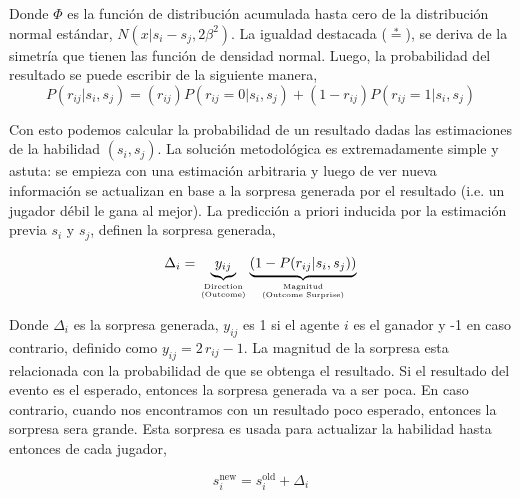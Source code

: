 \documentclass[11pt,twoside,spanish]{report} %
\newcommand\hfrac[2]{\genfrac{}{}{0pt}{}{#1}{#2}}
\begin{document}
Donde $\Phi$ es la funci\'on de distribuci\'on acumulada hasta cero de la distribuci\'on normal est\'andar, $N(x|s_i - s_j, 2\beta^2 )$.
La igualdad destacada ($\overset{*}{=}$), se deriva de la simetr\'ia que tienen las funci\'on de densidad normal.
Luego, la probabilidad del resultado se puede escribir de la siguiente manera,
\begin{equation}
P(r_{ij}|s_i,s_j) = (r_{ij})P(r_{ij}=0|s_i,s_j) +  (1-r_{ij})P(r_{ij}=1|s_i,s_j)
\end{equation}

Con esto podemos calcular la probabilidad de un resultado dadas las estimaciones de la habilidad $ (s_i, s_j) $.
La soluci\'on metodol\'ogica es extremadamente simple y astuta: se empieza con una estimaci\'on arbitraria y luego de ver nueva informaci\'on se actualizan en base a la sorpresa generada por el resultado (i.e. un jugador d\'ebil le gana al mejor).
La predicci\'on a priori inducida por la estimaci\'on previa $s_i$ y $s_j$, definen la sorpresa generada,

\begin{equation}
\Delta_i = \underbrace{y_{ij}}_{\hfrac{\text{Direction}}{\text{(Outcome)}}}\underbrace{\left(1-P(r_{ij}|s_i,s_j)\right)}_{\hfrac{\text{Magnitud}}{\text{(Outcome Surprise)}}}
\end{equation}

Donde $\Delta_i$ es la sorpresa generada, $y_{ij}$ es 1 si el agente $i$ es el ganador y -1 en caso contrario, definido como $y_{ij} =  2\,r_{ij} - 1$.
La magnitud de la sorpresa esta relacionada con la probabilidad de que se obtenga el resultado.
Si el resultado del evento es el esperado, entonces la sorpresa generada va a ser poca.
En caso contrario, cuando nos encontramos con un resultado poco esperado, entonces la sorpresa sera grande.
Esta sorpresa es usada para actualizar la habilidad hasta entonces de cada jugador,

\begin{equation}\label{eq:elo}
s_i^{\text{new}} = s_i^{\text{old}} + \Delta_i
\end{equation}
\end{document}
